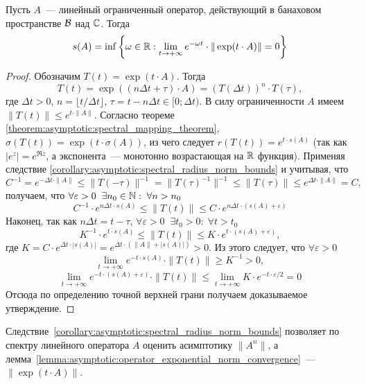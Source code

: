 \begin{lemma}
    \label{lemma:asymptotic:operator_exponential_norm_convergence}
    Пусть $ A $~--- линейный ограниченный оператор, действующий в банаховом пространстве $ \mathcal{B} $ над $ \mathbb{C} $.
    Тогда
    \[
        s(A) = \inf \left \{ \omega \in \mathbb{R}: \lim_{t \to +\infty} e^{-\omega t} \cdot \| \exp(t \cdot A) \| = 0 \right \}
    \]
\end{lemma}

\begin{proof}
    Обозначим $ T(t) = \exp(t \cdot A) $.
    Тогда
    \[
        T(t) = \exp((n \Delta t + \tau) \cdot A) = \left( T(\Delta t) \right)^n \cdot T(\tau),
    \]
    где $ \Delta t > 0 $, $ n = \lfloor t / \Delta t \rfloor $, $ \tau = t - n \Delta t \in [0;\Delta t) $.
    В силу ограниченности $ A $ имеем $ \| T(t) \| \leqslant e^{t \cdot \| A \|} $.
    Согласно теореме \ref{theorem:asymptotic:spectral_mapping_theorem}, $ \sigma(T(t)) = \exp(t \cdot \sigma(A)) $,
    из чего следует $ r(T(t)) = e^{t \cdot s(A)} $
    (так как $ \left| e^z \right| = e^{\Re z} $, а экспонента~--- монотонно возрастающая на $ \mathbb{R} $ функция).
    Применяя следствие \ref{corollary:asymptotic:spectral_radius_norm_bounds} и учитывая, что
    \[
        C^{-1} = e^{-\Delta t \cdot \| A \|} \leqslant \| T(-\tau) \|^{-1} = \| T(\tau)^{-1} \|^{-1} \leqslant \| T(\tau) \| \leqslant e^{\Delta t \cdot \| A \|} = C,
    \]
    получаем, что $ \forall \varepsilon > 0 \;\; \exists n_0 \in \mathbb{N}: \; \forall n > n_0 $
    \[
        C^{-1} \cdot e^{n \Delta t \cdot s(A)} \leqslant \| T(t) \| \leqslant C \cdot e^{n \Delta t \cdot (s(A) + \varepsilon)}
    \]
    Наконец, так как $ n \Delta t = t - \tau $, $ \forall \varepsilon > 0 \;\; \exists t_0 > 0: \; \forall t > t_0 $
    \[
        K^{-1} \cdot e^{t \cdot s(A)} \leqslant \| T(t) \| \leqslant K \cdot e^{t \cdot (s(A) + \varepsilon)},
    \]
    где $ K = C \cdot e^{\Delta t \cdot |s(A)|} = e^{\Delta t \cdot (\|A\| + |s(A)|)} > 0 $. %
    Из этого следует, что $ \forall \varepsilon > 0 $
    \[
        \lim_{t \to +\infty} e^{-t \cdot s(A)} \cdot \| T(t) \| \geqslant K^{-1} > 0,
    \]
    \[
        \lim_{t \to +\infty} e^{-t \cdot (s(A) + \varepsilon)} \cdot \| T(t) \| \leqslant \lim_{t \to +\infty} K \cdot e^{-t \cdot \varepsilon / 2} = 0
    \]
    Отсюда по определению точной верхней грани получаем доказываемое утверждение.
\end{proof}

Следствие~\ref{corollary:asymptotic:spectral_radius_norm_bounds}
позволяет по спектру линейного оператора $ A $ оценить асимптотику $ \| A^n \| $,
а лемма~\ref{lemma:asymptotic:operator_exponential_norm_convergence}~--- $ \| \exp(t \cdot A) \| $.

